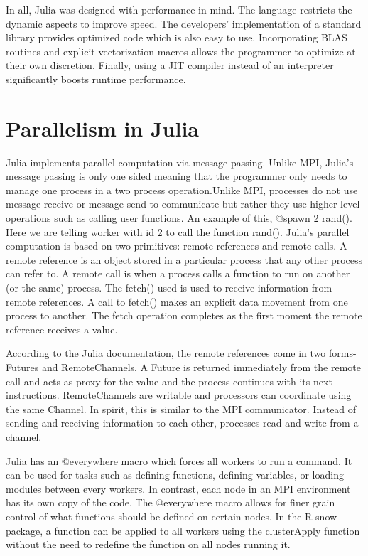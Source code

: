 \documentclass[12pt]{article}
\begin{document}
In all, Julia was designed with performance in mind. The language restricts the dynamic aspects to improve speed. The developers' implementation of a standard library provides optimized code which is also easy to use. Incorporating BLAS routines and explicit vectorization macros allows the programmer to optimize at their own discretion. Finally, using a JIT compiler instead of an interpreter significantly boosts runtime performance.

\section{Parallelism in Julia}

Julia implements parallel computation via message passing. Unlike MPI, Julia’s message passing is only one sided meaning that the programmer only needs to manage one process in a two process operation.Unlike MPI, processes do not use message receive or message send to communicate but rather they use higher level operations such as calling user functions\cite{juliadocs}. An example of this, @spawn 2 rand(). Here we are telling worker with id 2 to call the function rand(). Julia’s parallel computation is based on two primitives: remote references and remote calls. A remote reference is an object stored in a particular process that any other process can refer to. A remote call is when a process calls a function to run on another (or the same) process. The fetch() used is used to receive information from remote references. A call to fetch() makes an explicit data movement from one process to another. The fetch operation completes as the first moment the remote reference receives a value\cite{juliadocs}.

According to the Julia documentation, the remote references come in two forms- Futures and RemoteChannels. A Future is returned immediately from the remote call and acts as proxy for the value and the process continues with its next instructions. RemoteChannels are writable and processors can coordinate using the same Channel\cite{juliadocs}. In spirit, this is similar to the MPI communicator. Instead of sending and receiving information to each other, processes read and write from a channel. 

Julia has an @everywhere macro which forces all workers to run a command. It can be used for tasks such as defining functions, defining variables, or loading modules between every workers\cite{juliadocs}. In contrast, each node in an MPI environment has its own copy of the code. The @everywhere macro allows for finer grain control of what functions should be defined on certain nodes. In the R snow package, a function can be applied to all workers using the clusterApply function without the need to redefine the function on all nodes running it.
\end{document}

